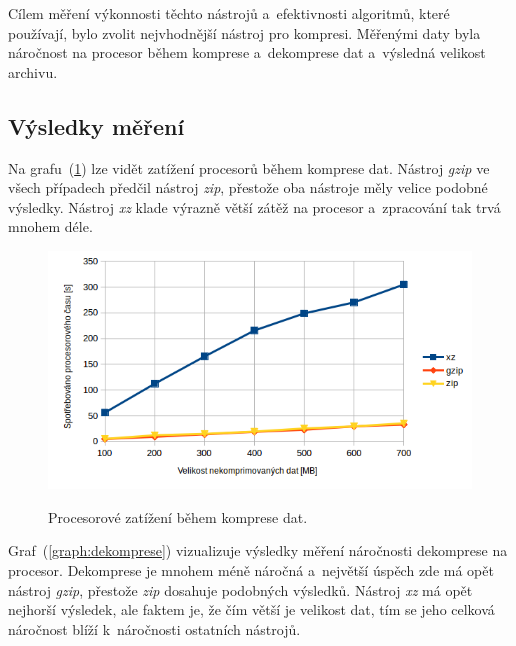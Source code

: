 Cílem měření výkonnosti těchto nástrojů a~efektivnosti algoritmů, které používají, bylo
zvolit nejvhodnější nástroj pro kompresi. Měřenými daty byla náročnost na procesor
během komprese a~dekomprese dat a~výsledná velikost archivu.

\subsection{Výsledky měření}
Na grafu~(\ref{graph:komprese}) lze vidět zatížení procesorů během komprese dat.
Nástroj \textit{gzip}  ve všech případech předčil nástroj \textit{zip}, přestože
oba nástroje měly velice podobné výsledky. Nástroj \textit{xz} klade výrazně
větší zátěž na procesor a~zpracování tak trvá mnohem déle.

\begin{figure}[H]
    \begin{center}
        \label{graph:komprese}
        \includegraphics[width=1.0\textwidth]{obrazky-figures/graph_komprese.png}
        \caption{Procesorové zatížení během komprese dat.}
    \end{center}
\end{figure}

Graf~(\ref{graph:dekomprese}) vizualizuje výsledky měření náročnosti dekomprese na
procesor. Dekomprese je mnohem méně náročná a~největší úspěch zde má opět nástroj
\textit{gzip}, přestože \textit{zip} dosahuje podobných výsledků. Nástroj \textit{xz}
má opět nejhorší výsledek, ale faktem je, že čím větší je velikost dat, tím
se jeho celková náročnost blíží k~náročnosti ostatních nástrojů.

